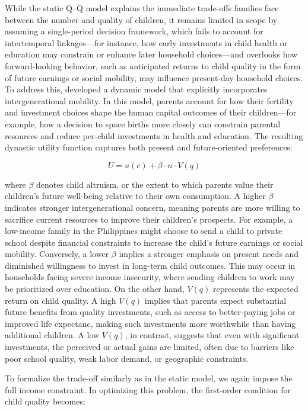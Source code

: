 \documentclass[]{AEA}
\begin{document}
While the static Q--Q model explains the immediate trade-offs families
face between the number and quality of children, it remains limited in
scope by assuming a single-period decision framework, which fails to
account for intertemporal linkages---for instance, how early investments
in child health or education may constrain or enhance later household
choices---and overlooks how forward-looking behavior, such as
anticipated returns to child quality in the form of future earnings or
social mobility, may influence present-day household choices. To address
this, \citet{becker1976child} developed a dynamic model that explicitly
incorporates intergenerational mobility. In this model, parents account
for how their fertility and investment choices shape the human capital
outcomes of their children---for example, how a decision to space births
more closely can constrain parental resources and reduce per-child
investments in health and education. The resulting dynastic utility
function captures both present and future-oriented preferences:

\[
U = u(c) + \beta \cdot n \cdot V(q)
\]

where \(\beta\) denotes child altruism, or the extent to which parents
value their children's future well-being relative to their own
consumption. A higher \(\beta\) indicates stronger intergenerational
concern, meaning parents are more willing to sacrifice current resources
to improve their children's prospects. For example, a low-income family
in the Philippines might choose to send a child to private school
despite financial constraints to increase the child's future earnings or
social mobility. Conversely, a lower \(\beta\) implies a stronger
emphasis on present needs and diminished willingness to invest in
long-term child outcomes. This may occur in households facing severe
income insecurity, where sending children to work may be prioritized
over education. On the other hand, \(V(q)\) represents the expected
return on child quality. A high \(V(q)\) implies that parents expect
substantial future benefits from quality investments, such as access to
better-paying jobs or improved life expectanc, making such investments
more worthwhile than having additional children. A low \(V(q)\), in
contrast, suggests that even with significant investments, the perceived
or actual gains are limited, often due to barriers like poor school
quality, weak labor demand, or geographic constraints.

To formalize the trade-off similarly as in the static model, we again
impose the full income constraint. In optimizing this problem, the
first-order condition for child quality becomes:
\end{document}
